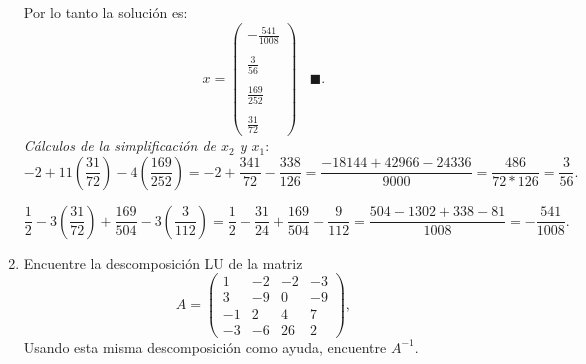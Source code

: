 \documentclass[11pt,letterpaper]{article}
\newcommand{\finf}{\blacksquare.}
\begin{document}
\begin{enumerate}
Por lo tanto la solución es:
$$x=\begin{pmatrix}
-\frac{541}{1008}\\ \\
\frac{3}{56}\\ \\ 
\frac{169}{252}\\ \\
\frac{31}{72}
\end{pmatrix} \ \ \ \ \finf
$$
\textit{Cálculos de la simplificación de $x_2$ y $x_1:$}
$$-2+11\left(\frac{31}{72}\right) -4\left(\frac{169}{252}\right)=-2+\frac{341}{72}-\frac{338}{126}=\frac{-18144+42966-24336}{9000}=\frac{486}{72*126}=\frac{3}{56}.$$

$$\frac{1}{2}-3\left(\frac{31}{72}\right) + \frac{169}{504}-3\left( \frac{3}{112} \right)=\frac{1}{2}-\frac{31}{24}+\frac{169}{504}-\frac{9}{112}=\frac{504-1302+338-81}{1008}=-\frac{541}{1008}.$$
\item Encuentre la descomposición LU de la matriz 
\begin{equation*}
A=\left(\begin{array}{rrrr}
 1 & -2 & -2 &-3\\
 3 & -9 &  0 &-9\\
-1 &  2 &  4 & 7\\
-3 & -6 & 26 & 2
\end{array} \right),
\end{equation*}
Usando esta misma descomposición como ayuda, encuentre $A^{-1}$.


\end{enumerate}
\end{document}
